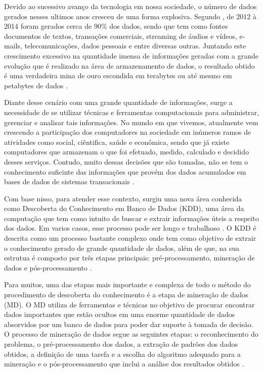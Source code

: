 
\par
Devido ao sucessivo avanço da tecnologia em nossa sociedade, o número de dados gerados nesses ultimos anos cresceu de uma forma explosiva. Segundo , de 2012 à 2014 foram gerados cerca de 90\% dos dados, sendo que tem como fontes documentos de textos, transações comerciais, streaming de áudios e vídeos, e-mails, telecomunicações, dados pessoais e entre diversas outras. Juntando este crescimento excessivo na quantidade imensa de informações geradas com a grande evolução que é realizado na área de armazenamento de dados, o resultado obtido é uma verdadeira mina de ouro escondida em terabytes ou até mesmo em petabytes de dados \cite{Carvalho2014}. 

\par
Diante desse cenário com uma grande quantidade de informações, surge a necessidade de se utilizar técnicas e ferramentas computacionais para administrar, gerenciar e analisar tais informações. No mundo em que vivemos, atualmente vem crescendo a participação dos computadores na sociedade em inúmeros ramos de atividades como social, ciêntifica, saúde e econômica, sendo que já existe computadores que armazenam o que foi efetuado, medido, calculado e decidido desses serviços. Contudo, muito dessas decisões que são tomadas, não se tem o conhecimento suficinte das informações que provém dos dados acumulados em bases de dados de sistemas transacionais \cite{Rabelo2007}.

\par
Com base nisso, para atender esse contexto, surgiu uma nova área conhecida como Descoberta do Conhecimento em Banco de Dados (KDD), uma área da computação que tem como intuito de buscar e extrair informações úteis a respeito dos dados. Em varios casos, esse processo pode ser longo e trabalhoso \cite{Stulp2014}. O KDD é descrita como um processo bastante complexo onde tem como objetivo de extrair o conhecimento gerado de grande quantidade de dados, além de que, na sua estrutua é composto por três etapas principais: pré-processamento, mineração de dados e pós-processamento \cite{Rabelo2007}.

\par
Para muitos, uma das etapas mais importante e complexa de todo o método do procedimento de descoberta do conhecimento é a etapa de mineração de dados (MD). O MD utiliza de ferramentas e técnicas no objetivo de procurar encontrar dados importantes que estão ocultos em uma enorme quantidade de dados absorvidos por um banco de dados para poder dar suporte à tomada de decisão. O processo de mineração de dados segue as seguintes etapas: o reconhecimento do problema, o pré-processamento dos dados, a extração de padrões dos dados obtidos, a definição de uma tarefa e a escolha do algoritmo adequado para a mineração e o pós-processamento que inclui a análise dos resultados obtidos \cite{Stulp2014}. 

